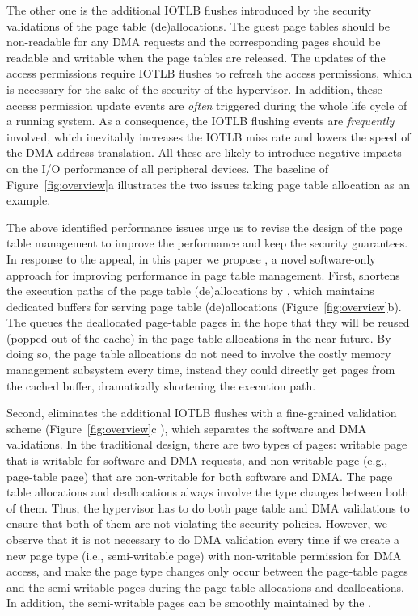 The other one is the additional IOTLB flushes introduced by the security validations of the page table (de)allocations.
The guest page tables should be non-readable for any DMA requests and the corresponding pages should be readable and writable when the page tables are released.
The updates of the access permissions require IOTLB flushes to refresh the access permissions, which is necessary for the sake of the security of the hypervisor.
In addition, these access permission update events are \emph{often} triggered during the whole life cycle of a running system.
As a consequence, the IOTLB flushing events are \emph{frequently} involved, which inevitably increases the IOTLB miss rate and lowers the speed of the DMA address translation.
All these are likely to introduce negative impacts on the I/O performance of all peripheral devices.
The baseline of Figure~\ref{fig:overview}a illustrates the two issues taking page table allocation as an example.

The above identified performance issues urge us to revise the design of the page table management to improve the performance and keep the security guarantees.
In response to the appeal, in this paper we propose \name, a novel software-only approach for improving performance in page table management.
First, \name shortens the execution paths of the page table (de)allocations by \cache, which maintains dedicated buffers for serving page table (de)allocations (Figure~\ref{fig:overview}b).
The \cache queues the deallocated page-table pages in the hope that
they will be reused (popped out of the cache) in the page table allocations in the near future.
By doing so, the page table allocations do not need to involve the costly memory management subsystem every time, instead they could directly get pages from the cached buffer, dramatically shortening the execution path.

Second, \name eliminates the additional IOTLB flushes with a fine-grained validation scheme (Figure~\ref{fig:overview}c ), which separates the software and DMA validations.
In the traditional design, there are two types of pages: writable page that is writable for software and DMA requests, and non-writable page (e.g., page-table page) that are non-writable for both software and DMA.
The page table allocations and deallocations always involve the type changes between both of them.
Thus, the hypervisor has to do both page table and DMA validations to ensure that both of them are not violating the security policies.
However, we observe that it is not necessary to do DMA validation every time if we create a new page type (i.e., semi-writable page) with non-writable permission for DMA access, and make the page type changes only occur between the page-table pages and the semi-writable pages during the page table allocations and deallocations.
In addition, the semi-writable pages can be smoothly maintained by the \cache.


